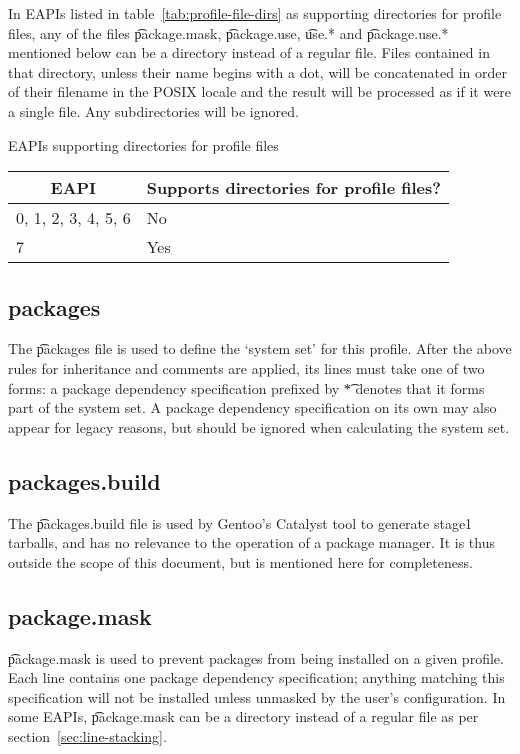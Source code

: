  In EAPIs listed in table~\ref{tab:profile-file-dirs} as supporting
directories for profile files, any of the files \t{package.mask}, \t{package.use}, \t{use.*} and
\t{package.use.*} mentioned below can be a directory instead of a regular file. Files contained
in that directory, unless their name begins with a dot, will be concatenated in order of their
filename in the POSIX locale and the result will be processed as if it were a single file.
Any subdirectories will be ignored.

\begin{centertable}{EAPIs supporting directories for profile files}
    \label{tab:profile-file-dirs}
    \begin{tabular}{ll}
      \toprule
      \multicolumn{1}{c}{\textbf{EAPI}} &
      \multicolumn{1}{c}{\textbf{Supports directories for profile files?}} \\
      \midrule
      0, 1, 2, 3, 4, 5, 6 & No  \\
      7                   & Yes \\
      \bottomrule
    \end{tabular}
\end{centertable}

\subsection{packages}
The \t{packages} file is used to define the `system set' for this profile.
After the above rules for inheritance and comments are applied, its lines must take one of two
forms: a package dependency specification prefixed by \t{*} denotes that it forms part of the
system set. A package dependency specification on its own may also appear for legacy reasons, but
should be ignored when calculating the system set.

\subsection{packages.build}
The \t{packages.build} file is used by Gentoo's Catalyst tool to generate stage1 tarballs, and has
no relevance to the operation of a package manager. It is thus outside the scope of this document,
but is mentioned here for completeness.

\subsection{package.mask}
\t{package.mask} is used to prevent packages from being installed on a given profile. Each line
contains one package dependency specification; anything matching this specification will not be
installed unless unmasked by the user's configuration. In some EAPIs, \t{package.mask} can be a
directory instead of a regular file as per section~\ref{sec:line-stacking}.

